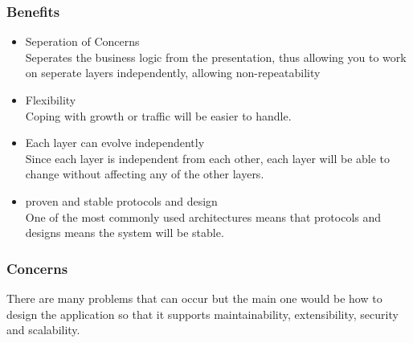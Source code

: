 \documentclass{article}
\begin{document}
					\subsubsection{Benefits}
 						\begin{itemize}
 							\item Seperation of Concerns
 							\bigskip
 							\\
 							Seperates the business logic from the presentation, thus allowing you to work on seperate layers independently, allowing non-repeatability
 							\item Flexibility
 							\bigskip
 							\\
 							Coping with growth or traffic will be easier to handle.
 							\item Each layer can evolve independently
 							\bigskip
 							\\
 							Since each layer is independent from each other, each layer will be able to change without affecting any of the other layers.
 							\item proven and stable protocols and design
 							\bigskip
 							\\
 							 One of the most commonly used architectures means that protocols and designs means the system will be stable.
 						\end{itemize} 
	\subsubsection{Concerns}
 			
 				There are many problems that can occur but the main one would be how to design the application so that it supports maintainability, extensibility, security and scalability.
 	
	 \newpage
 	
 	
 	
 	
 	
			
\end{document}
